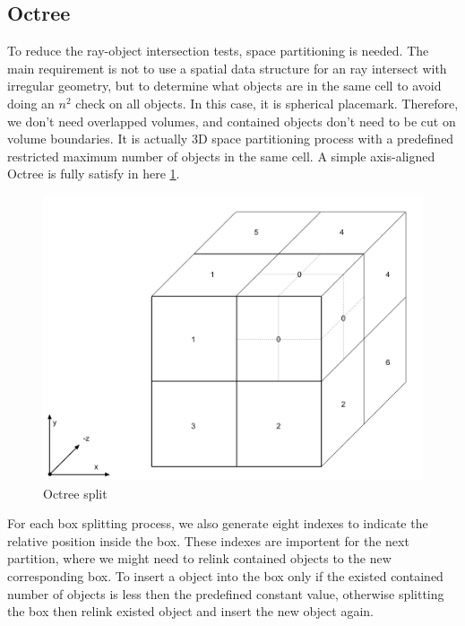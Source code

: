 \subsection{Octree} 
\label{section:octree}

To reduce the ray-object intersection tests,  space partitioning is needed. The main requirement is not to use a spatial data structure for an ray intersect with irregular geometry, but to determine what objects are in the same cell to avoid doing an $n^2$ check on all objects. In this case, it is spherical placemark. Therefore, we don't need overlapped volumes, and contained objects don't need to be cut on volume boundaries. It is actually 3D space partitioning process with a predefined restricted maximum number of objects in the same cell. A simple axis-aligned Octree is fully satisfy in here \ref{fig:octree-split}.

\begin{figure}[H]
\caption[octree-split]{Octree split}
\label{fig:octree-split}
\centering
\includegraphics[width=\linewidth]{Figures/octree-split.png}
\decoRule
\end{figure}

For each box splitting process, we also generate eight indexes to indicate the relative position inside the box. These indexes are importent for the next partition, where we might need to relink contained objects to the new corresponding box. To insert a object into
the box only if the existed contained number of objects is less then the predefined constant value, otherwise splitting the box then relink existed object and insert the new object again.

